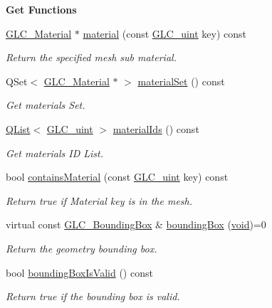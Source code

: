 \begin{Indent}{\bf Get Functions}
\begin{DoxyCompactItemize}
\hyperlink{class_g_l_c___material}{G\-L\-C\-\_\-\-Material} $\ast$ \hyperlink{class_g_l_c___geometry_ab5a3cbfb9c6cfe1d7711f2f3f2f0e6d8}{material} (const \hyperlink{glc__global_8h_abf950976fabed69026558df8e2da6c6b}{G\-L\-C\-\_\-uint} key) const 
\begin{DoxyCompactList}\small\item\em Return the specified mesh sub material. \end{DoxyCompactList}\item 
Q\-Set$<$ \hyperlink{class_g_l_c___material}{G\-L\-C\-\_\-\-Material} $\ast$ $>$ \hyperlink{class_g_l_c___geometry_a2f41bcb02480d0f0cbfce0004f5430d5}{material\-Set} () const 
\begin{DoxyCompactList}\small\item\em Get materials Set. \end{DoxyCompactList}\item 
\hyperlink{class_q_list}{Q\-List}$<$ \hyperlink{glc__global_8h_abf950976fabed69026558df8e2da6c6b}{G\-L\-C\-\_\-uint} $>$ \hyperlink{class_g_l_c___geometry_a3c9e09835964c39497f98638b5b9bec7}{material\-Ids} () const 
\begin{DoxyCompactList}\small\item\em Get materials I\-D List. \end{DoxyCompactList}\item 
bool \hyperlink{class_g_l_c___geometry_a5e88a8ad836ab0b56a9b87489bdfcb13}{contains\-Material} (const \hyperlink{glc__global_8h_abf950976fabed69026558df8e2da6c6b}{G\-L\-C\-\_\-uint} key) const 
\begin{DoxyCompactList}\small\item\em Return true if Material key is in the mesh. \end{DoxyCompactList}\item 
virtual const \hyperlink{class_g_l_c___bounding_box}{G\-L\-C\-\_\-\-Bounding\-Box} \& \hyperlink{class_g_l_c___geometry_a84c5dd9cfe6e42fed117f849e9963790}{bounding\-Box} (\hyperlink{group___u_a_v_objects_plugin_ga444cf2ff3f0ecbe028adce838d373f5c}{void})=0
\begin{DoxyCompactList}\small\item\em Return the geometry bounding box. \end{DoxyCompactList}\item 
bool \hyperlink{class_g_l_c___geometry_a6e253dc44d276549a573d2046b79dab1}{bounding\-Box\-Is\-Valid} () const 
\begin{DoxyCompactList}\small\item\em Return true if the bounding box is valid. \end{DoxyCompactList}\item 

\end{DoxyCompactItemize}
\end{Indent}
